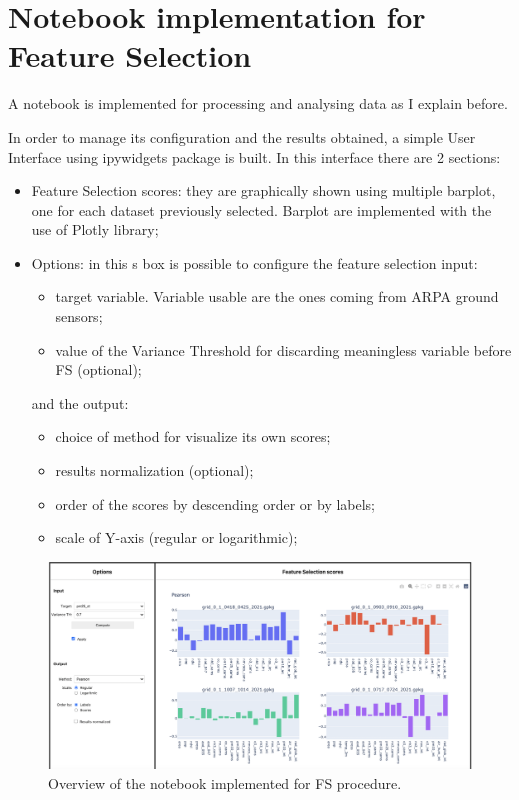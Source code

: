 \section{Notebook implementation for Feature Selection}
A notebook is implemented for processing and analysing data as I explain before.\newline

In order to manage its configuration and the results obtained, a simple User Interface using ipywidgets package is built.
In this interface there are 2 sections:
\begin{itemize}
\item Feature Selection scores: they are graphically shown using multiple barplot, one for each dataset previously selected. Barplot are implemented with the use of Plotly library; 
\item Options: in this s box is possible to configure the feature selection input:
\begin{itemize}
\item target variable. Variable usable are the ones coming from ARPA ground sensors;
\item value of the Variance Threshold for discarding meaningless variable before FS (optional);
\end{itemize}
and the output:
\begin{itemize}
\item choice of method for visualize its own scores;
\item results normalization (optional);
\item order of the scores by descending order or by labels;
\item scale of Y-axis (regular or logarithmic);
\end{itemize}
\end{itemize}

\begin{figure}[H]
    \centering
    \includegraphics[scale=0.40]{images/notebook.png}
    \caption{Overview of the notebook implemented for FS procedure.}
    \label{fig:notebook}
\end{figure}


